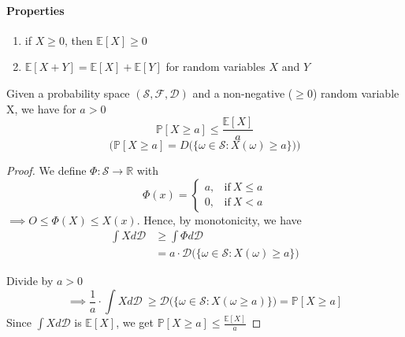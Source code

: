 \documentclass[10pt,a4paper]{article}
\theoremstyle{definition}
\theoremstyle{plain}
\begin{document}
\paragraph{Properties}
\begin{enumerate}
	\item if $X\geq 0$, then $\mathbb{E}[X] \geq 0$
	\item $\mathbb{E}[X+Y] = \mathbb{E}[X] + \mathbb{E}[Y]$ for random variables $X$ and $Y$
\end{enumerate}
\begin{boxeddef}
	Given a probability space $\mathcal{(S, F, D)}$ and a non-negative ($\geq 0$) random variable X, we have for $ a > 0$ 
	$$ \mathbb{P}[X\geq a] \leq \frac{\mathbb{E}[X]}{a}$$
	$$ \Big( \mathbb{P}[X\geq a] = D\big(\{\omega \in \mathcal{S}: X(\omega) \geq a \} \big)\Big)$$
\end{boxeddef}
\begin{proof}
	We define $\Phi: \mathcal{S} \to \mathbb{R}$ with
	$$ \Phi(x) = \begin{cases}
		a, & \text{if}\ X \leq a \\
		0, & \text{if}\ X < a
	\end{cases} $$
	$\implies O \leq \Phi(X) \leq X(x)$. Hence, by monotonicity, we have
	\begin{equation*}
	\begin{split}
		\int Xd\mathcal{D} &\geq \int \Phi d\mathcal{D}\\
				&= a\cdot \mathcal{D}\big( \{\omega \in\mathcal{ S}: X(\omega) \geq a\}\big)
	\end{split}		
	\end{equation*}
	
	Divide by $a>0$
	$$ \implies \frac{1}{a} \cdot \int Xd\mathcal{D} \ \geq \mathcal{D}\big( \{\omega \in \mathcal{S}: X(\omega \geq a) \} \big) = \mathbb{P}[X\geq a]$$
	Since $\int Xd\mathcal{D}$ is $\mathbb{E}[X]$, we get $\mathbb{P}[X\geq a]\leq \frac{\mathbb{E}[X]}{a}$
\end{proof}
%
\end{document}
